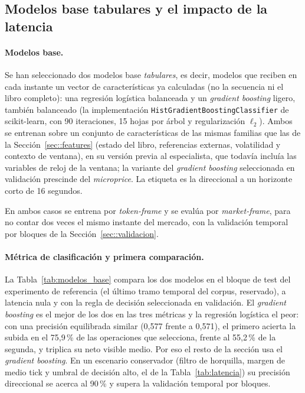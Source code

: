 \subsection{Modelos base tabulares y el impacto de la latencia}
\label{sec::linea_base}

\paragraph{Modelos base.} Se han seleccionado dos modelos base \emph{tabulares}, es decir,
modelos que reciben en cada instante un vector de características ya calculadas (no la
secuencia ni el libro completo): una regresión logística balanceada y un \emph{gradient
boosting} ligero, también balanceado (la implementación
\texttt{HistGradientBoostingClassifier} de scikit-learn, con 90 iteraciones, 15 hojas
por árbol y regularización $\ell_2$). Ambos se entrenan sobre un conjunto de características
de las mismas familias que las de la Sección~\ref{sec::features} (estado del libro,
referencias externas, volatilidad y contexto de ventana), en su versión previa al
especialista, que todavía incluía las variables de reloj de la ventana; la variante del
\emph{gradient boosting} seleccionada en validación prescinde del \emph{microprice}. La
etiqueta es la direccional a un horizonte corto de 16 segundos.

En ambos casos se entrena por \emph{token-frame} y se evalúa por \emph{market-frame}, para
no contar dos veces el mismo instante del mercado, con la validación temporal por bloques de
la Sección~\ref{sec::validacion}.

\paragraph{Métrica de clasificación y primera comparación.} La Tabla~\ref{tab:modelos_base}
compara los dos modelos en el bloque de test del experimento de referencia (el último tramo
temporal del corpus, reservado), a latencia nula y con la regla de decisión seleccionada en
validación. El \emph{gradient boosting} es el
mejor de los dos en las tres métricas y la regresión logística el peor: con una precisión
equilibrada similar (0,577 frente a 0,571), el primero acierta la subida en el 75,9\,\% de
las operaciones que selecciona, frente al 55,2\,\% de la segunda, y triplica su neto visible
medio. Por eso el resto de la sección usa el \emph{gradient boosting}. En un escenario
conservador (filtro de horquilla, margen de medio tick y umbral de decisión alto, el de la
Tabla~\ref{tab:latencia}) su precisión direccional se acerca al 90\,\% y supera la
validación temporal por bloques.

